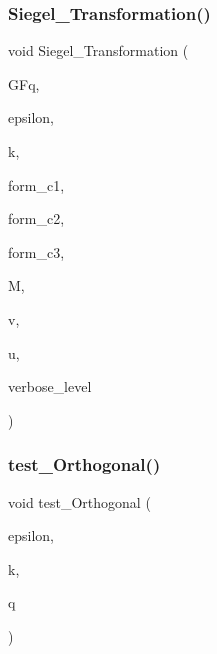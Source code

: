 \subsubsection{\texorpdfstring{Siegel\+\_\+\+Transformation()}{Siegel\_Transformation()}}
{\footnotesize\ttfamily void Siegel\+\_\+\+Transformation (\begin{DoxyParamCaption}\item[{\mbox{\hyperlink{classfinite__field}{finite\+\_\+field}} \&}]{G\+Fq,  }\item[{\mbox{\hyperlink{galois_8h_a09fddde158a3a20bd2dcadb609de11dc}{I\+NT}}}]{epsilon,  }\item[{\mbox{\hyperlink{galois_8h_a09fddde158a3a20bd2dcadb609de11dc}{I\+NT}}}]{k,  }\item[{\mbox{\hyperlink{galois_8h_a09fddde158a3a20bd2dcadb609de11dc}{I\+NT}}}]{form\+\_\+c1,  }\item[{\mbox{\hyperlink{galois_8h_a09fddde158a3a20bd2dcadb609de11dc}{I\+NT}}}]{form\+\_\+c2,  }\item[{\mbox{\hyperlink{galois_8h_a09fddde158a3a20bd2dcadb609de11dc}{I\+NT}}}]{form\+\_\+c3,  }\item[{\mbox{\hyperlink{galois_8h_a09fddde158a3a20bd2dcadb609de11dc}{I\+NT}} $\ast$}]{M,  }\item[{\mbox{\hyperlink{galois_8h_a09fddde158a3a20bd2dcadb609de11dc}{I\+NT}} $\ast$}]{v,  }\item[{\mbox{\hyperlink{galois_8h_a09fddde158a3a20bd2dcadb609de11dc}{I\+NT}} $\ast$}]{u,  }\item[{\mbox{\hyperlink{galois_8h_a09fddde158a3a20bd2dcadb609de11dc}{I\+NT}}}]{verbose\+\_\+level }\end{DoxyParamCaption})}

\mbox{\label{_l_i_b_2_g_a_l_o_i_s_2orthogonal__points_8_c_a071f90f8a33649e2d4a8f5c9a401a4f4}} 
\subsubsection{\texorpdfstring{test\+\_\+\+Orthogonal()}{test\_Orthogonal()}}
{\footnotesize\ttfamily void test\+\_\+\+Orthogonal (\begin{DoxyParamCaption}\item[{\mbox{\hyperlink{galois_8h_a09fddde158a3a20bd2dcadb609de11dc}{I\+NT}}}]{epsilon,  }\item[{\mbox{\hyperlink{galois_8h_a09fddde158a3a20bd2dcadb609de11dc}{I\+NT}}}]{k,  }\item[{\mbox{\hyperlink{galois_8h_a09fddde158a3a20bd2dcadb609de11dc}{I\+NT}}}]{q }\end{DoxyParamCaption})}


